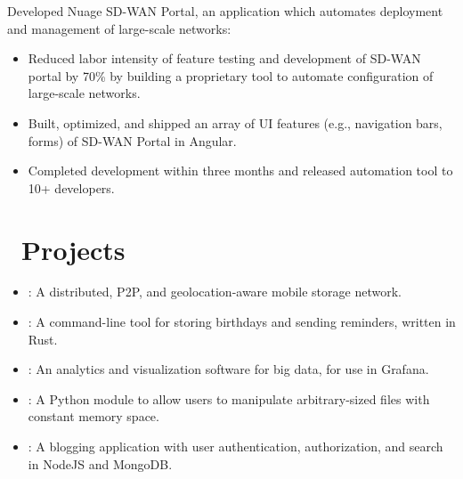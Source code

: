 \documentclass{resume}
\begin{document}
Developed Nuage SD-WAN Portal, an application which automates deployment and management of large-scale networks:
\begin{itemize}
  \item {Reduced labor intensity of feature testing and development of SD-WAN portal by 70\%
        by building a proprietary tool to automate configuration of large-scale networks.}
  \item {Built, optimized, and shipped an array of UI features (e.g., navigation bars, forms) of SD-WAN Portal in Angular.}
  \item {Completed development within three months and released automation tool to 10+ developers.}
\end{itemize}

\section{\faCodeFork\ Projects}
\begin{itemize}[parsep=0.5ex]
  \item {}: A distributed, P2P, and geolocation-aware mobile storage network.
  \item {}: A command-line tool for storing birthdays and sending reminders, written in Rust.
  \item {}: An analytics and visualization software for big data, for use in Grafana.
  \item {}: A Python module to allow users to manipulate arbitrary-sized files with constant memory space.
  \item {}: A blogging application with user authentication, authorization, and search in NodeJS and MongoDB.
\end{itemize}


%
%
\end{document}
